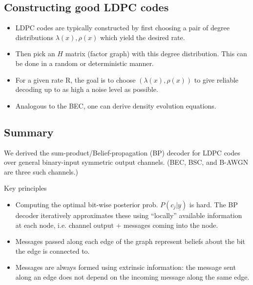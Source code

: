 \documentclass[12pt]{article}
\begin{document}
\subsection{Constructing good LDPC codes}
\begin{itemize}
    \item LDPC codes are typically constructed by first choosing a pair of degree distributions $\lambda(x),\rho(x)$ which yield the desired rate.
    \item Then pick an $H$ matrix (factor graph) with this degree distribution. This can be done in a random or deterministic manner.
    \item For a given rate R, the goal is to choose $(\lambda(x),\rho(x))$ to give reliable decoding up to as high a noise level as possible.
    \item Analogous to the BEC, one can derive density evolution equations.
\end{itemize}

\subsection{Summary}
We derived the sum-product/Belief-propagation (BP) decoder for LDPC codes over general binary-input symmetric output channels. (BEC, BSC, and B-AWGN are three such channels.)

Key principles
\begin{itemize}
    \item Computing the optimal bit-wise posterior prob. $P(c_j|\underline{y})$ is hard. The BP decoder iteratively approximates these using ``locally'' available information at each node, i.e. channel output + messages coming into the node.
    \item Messages passed along each edge of the graph represent beliefs about the bit the edge is connected to.
    \item Messages are always formed using extrinsic information: the message sent along an edge does not depend on the incoming message along the same edge.
\end{itemize}
\end{document}
